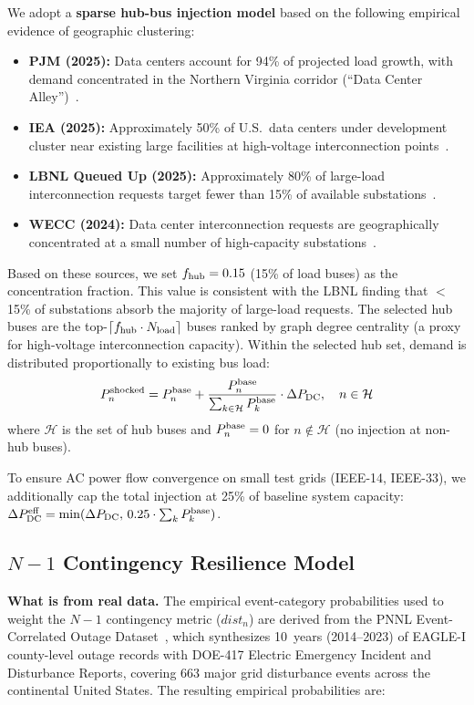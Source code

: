 \documentclass[11pt]{article}
\begin{document}
We adopt a \textbf{sparse hub-bus injection model} based on the following empirical evidence of geographic clustering:
\begin{itemize}[leftmargin=*,noitemsep,topsep=0pt]
  \item \textbf{PJM (2025):} Data centers account for 94\% of projected load growth, with demand concentrated in the Northern Virginia corridor (``Data Center Alley'')~\cite{pjm_load_2025}.
  \item \textbf{IEA (2025):} Approximately 50\% of U.S.\ data centers under development cluster near existing large facilities at high-voltage interconnection points~\cite{iea_dc_2025}.
  \item \textbf{LBNL Queued Up (2025):} Approximately 80\% of large-load interconnection requests target fewer than 15\% of available substations~\cite{lbnl_queued_2025}.
  \item \textbf{WECC (2024):} Data center interconnection requests are geographically concentrated at a small number of high-capacity substations~\cite{wecc_assessment_2024}.
\end{itemize}
Based on these sources, we set $f_{\rm hub} = 0.15$ (15\% of load buses) as the concentration fraction. This value is consistent with the LBNL finding that $<$15\% of substations absorb the majority of large-load requests. The selected hub buses are the top-$\lceil f_{\rm hub} \cdot N_{\rm load} \rceil$ buses ranked by graph degree centrality (a proxy for high-voltage interconnection capacity). Within the selected hub set, demand is distributed proportionally to existing bus load:
\begin{equation}
P_n^{\rm shocked} = P_n^{\rm base} + \frac{P_n^{\rm base}}{\sum_{k \in \mathcal{H}} P_k^{\rm base}} \cdot \Delta P_{\rm DC}, \quad n \in \mathcal{H}
\end{equation}
where $\mathcal{H}$ is the set of hub buses and $P_n^{\rm base} = 0$ for $n \notin \mathcal{H}$ (no injection at non-hub buses).

To ensure AC power flow convergence on small test grids (IEEE-14, IEEE-33), we additionally cap the total injection at 25\% of baseline system capacity: $\Delta P_{\rm DC}^{\rm eff} = \min(\Delta P_{\rm DC}, \, 0.25 \cdot \sum_k P_k^{\rm base})$.

\subsection{\texorpdfstring{$N-1$ Contingency Resilience Model}{N-1 Contingency Resilience Model}}
\textbf{What is from real data.}
The empirical event-category probabilities used to weight the $N-1$ contingency metric ($dist_n$) are derived from the PNNL Event-Correlated Outage Dataset~\cite{pnnl_oedi_6458}, which synthesizes 10~years (2014--2023) of EAGLE-I county-level outage records with DOE-417 Electric Emergency Incident and Disturbance Reports, covering 663 major grid disturbance events across the continental United States. The resulting empirical probabilities are:
\end{document}

